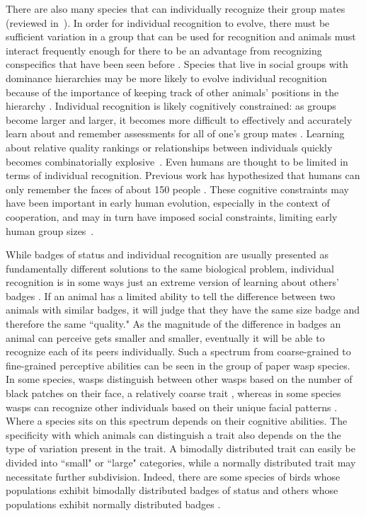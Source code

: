 There are also many species that can individually recognize their group mates (reviewed in~\citep{Tibbetts2007IndividualDifferent,Wiley2013SpecificityBehaviour}). In order for individual recognition to evolve, there must be sufficient variation in a group that can be used for recognition and animals must interact frequently enough for there to be an advantage from recognizing conspecifics that have been seen before \citep{Whitfield:1987tg,Sheehan:2014fk}. Species that live in social groups with dominance hierarchies may be more likely to evolve individual recognition because of the importance of keeping track of other animals' positions in the hierarchy \citep{Whitfield:1987tg,Barnard:1979fk}. Individual recognition is likely cognitively constrained: as groups become larger and larger, it becomes more difficult to effectively and accurately learn about and remember assessments for all of one's group mates \citep{Rohwer:1982fk,Solberg:1997uq}. Learning about relative quality rankings or relationships between individuals quickly becomes combinatorially explosive~\citep{Seyfarth2015SocialCognition}. Even humans are thought to be limited in terms of individual recognition. Previous work has hypothesized that humans can only remember the faces of about 150 people \citep{Dunbar:1993zr,Hill:2003ly}. These cognitive constraints may have been important in early human evolution, especially in the context of cooperation, and may in turn have imposed social constraints, limiting early human group sizes~\citep{Dunbar:1992ys,Dunbar:1993zr}.


While badges of status and individual recognition are usually presented as fundamentally different solutions to the same biological problem, individual recognition is in some ways just an extreme version of learning about others' badges \citep{Barnard:1979fk}. If an animal has a limited ability to tell the difference between two animals with similar badges, it will judge that they have the same size badge and therefore the same ``quality." As the magnitude of the difference in badges an animal can perceive gets smaller and smaller, eventually it will be able to recognize each of its peers individually.  Such a spectrum from coarse-grained to fine-grained perceptive abilities can be seen in the group of paper wasp species. In some species, wasps distinguish between other wasps based on the number of black patches on their face, a relatively coarse trait \citep{Tibbetts:2004kx}, whereas in some species wasps can recognize other individuals based on their unique facial patterns \citep{Tibbetts:2002ys}. Where a species sits on this spectrum depends on their cognitive abilities. The specificity with which animals can distinguish a trait also depends on the the type of variation present in the trait. A bimodally distributed trait can easily be divided into ``small" or ``large" categories, while a normally distributed trait may necessitate further subdivision. Indeed, there are some species of birds whose populations exhibit bimodally distributed badges of status and others whose populations exhibit normally distributed badges \citep{Ripoll:2004vn}.


